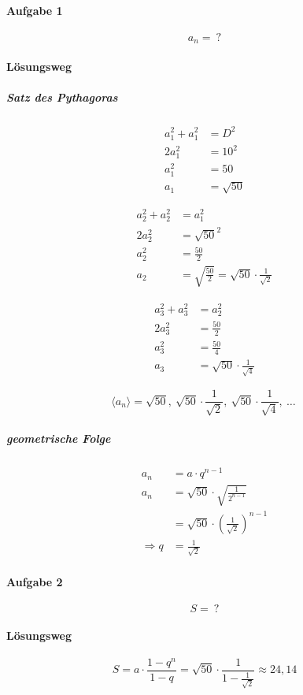 \paragraph{Aufgabe 1}

\[
	a_n =\ ?
\]

\paragraph{Lösungsweg}

\subparagraph{Satz des Pythagoras}

\begin{align*}
	a_1^2 + a_1^2 & = D^2       \\
	2 a_1^2       & = 10^2      \\
	a_1^2         & = 50        \\
	a_1           & = \sqrt{50}
\end{align*}

\begin{align*}
	a_2^2 + a_2^2 & = a_1^2                                                    \\
	2 a_2^2       & = {\sqrt{50}}^2                                            \\
	a_2^2         & = \frac{50}{2}                                             \\
	a_2           & = \sqrt{\frac{50}{2}} = \sqrt{50} \cdot \frac{1}{\sqrt{2}}
\end{align*}

\begin{align*}
	a_3^2 + a_3^2 & = a_2^2                              \\
	2 a_3^2       & = \frac{50}{2}                       \\
	a_3^2         & = \frac{50}{4}                       \\
	a_3           & = \sqrt{50} \cdot \frac{1}{\sqrt{4}}
\end{align*}

\[
	\langle a_n \rangle = \sqrt{50},\ \sqrt{50} \cdot \frac{1}{\sqrt{2}},\ \sqrt{50} \cdot \frac{1}{\sqrt{4}},\ \ldots \
\]

\subparagraph{geometrische Folge}

\begin{align*}
	a_n           & = a \cdot q^{n-1}                                         \\
	a_n           & = \sqrt{50} \cdot \sqrt{\frac{1}{2^{n-1}}}                \\
	              & = \sqrt{50} \cdot {\left(\frac{1}{\sqrt{2}}\right)}^{n-1} \\
	\Rightarrow q & = \frac{1}{\sqrt{2}}
\end{align*}

\paragraph{Aufgabe 2}

\[
	S =\ ?
\]

\paragraph{Lösungsweg}

\[
	S = a \cdot \frac{1 - q^n}{1 - q} = \sqrt{50} \cdot \frac{1}{1- \frac{1}{\sqrt{2}}} \approx 24,14
\]
